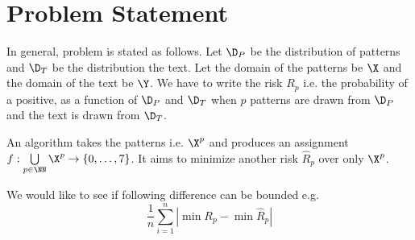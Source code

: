 \section{Problem Statement}

In general, problem is stated as follows. Let $\D_{P}$ be the distribution of patterns and $\D_T$ be the distribution the text. Let the domain of the patterns be $\X$ and the domain of the text be $\Y$. We have to write the risk $R_p$ i.e. the probability of a positive, as a function of $\D_P$ and $\D_T$ when $p$ patterns are drawn from $\D_P$ and the text is drawn from $\D_T$.

An algorithm takes the patterns i.e. $\X^p$ and produces an assignment $f:\bigcup\limits_{p\in \NN} \X^p \to \{0,\ldots, 7\}$. It aims to minimize another risk $\hat{R}_p$ over only $\X^p$.

We would like to see if following difference can be bounded e.g.
$$\frac{1}{n}\sum_{i=1}^n \left|\min R_p - \min \hat{R}_p\right|$$
